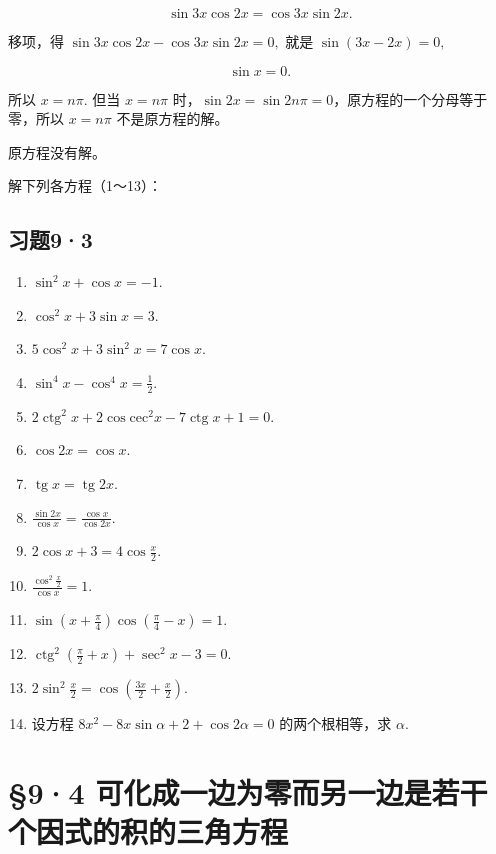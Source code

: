 \[
\sin 3 x \cos 2 x = \cos 3 x \sin 2 x. \tag {1}
\]

移项，得 \(\sin 3x\cos 2x - \cos 3x\sin 2x = 0,\) 就是
\(\sin (3x - 2x) = 0,\)

\[
\sin x = 0.
\]

所以 \(x = n\pi .\) 但当 \(x = n\pi\)
时，\(\sin 2x = \sin 2n\pi = 0\)，原方程的一个分母等于零，所以
\(x = n\pi\) 不是原方程的解。

原方程没有解。

解下列各方程（1～13）：

\subsection{习题9·3}

\begin{enumerate}
\item
  \(\sin^2 x + \cos x = -1\).
\item
  \(\cos^2 x + 3\sin x = 3.\)
\item
  \(5\cos^2 x + 3\sin^2 x = 7\cos x.\)
\item
  \(\sin^4 x - \cos^4 x = \frac{1}{2}\).
\item
  \(2\operatorname{ctg}^2 x + 2\cos \mathrm{cec}^2 x - 7\operatorname{ctg} x + 1 = 0.\)
\item
  \(\cos 2x = \cos x.\)
\item
  \(\operatorname{tg} x = \operatorname{tg} 2x\).
\item
  \(\frac{\sin 2x}{\cos x} = \frac{\cos x}{\cos 2x}\).
\item
  \(2\cos x + 3 = 4\cos \frac{x}{2}\).
\item
  \(\frac{\cos^2\frac{x}{2}}{\cos x} = 1.\)
\item
  \(\sin \left(x + \frac{\pi}{4}\right)\cos \left(\frac{\pi}{4} - x\right) = 1.\)
\item
  \(\operatorname{ctg}^2\left(\frac{\pi}{2} + x\right) + \sec^2 x - 3 = 0.\)
\item
  \(2\sin^2\frac{x}{2} = \cos \left(\frac{3x}{2} +\frac{x}{2}\right).\)
\item
  设方程 \(8x^{2} - 8x\sin \alpha + 2 + \cos 2\alpha = 0\)
  的两个根相等，求 \(\alpha\).
\end{enumerate}

\section{§9·4 可化成一边为零而另一边是若干个因式的积的三角方程}

